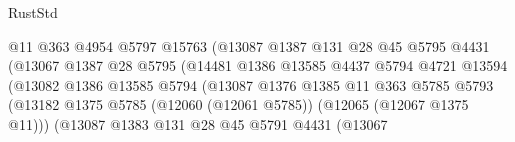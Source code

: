 \begin{lexlean}{RustStd}
\begin{coremodule}
                                          @11
                                          @363
                                          @4954
                                          @5797
                                          @15763
                                          (@13087
                                            @1387
                                            @131
                                            @28
                                            @45
                                            @5795
                                            @4431
                                            (@13067
                                              @1387
                                              @28
                                              @5795
                                              (@14481
                                                @1386
                                                @13585
                                                @4437
                                                @5794
                                                @4721
                                                @13594
                                                (@13082
                                                  @1386
                                                  @13585
                                                  @5794
                                                  (@13087
                                                    @1376
                                                    @1385
                                                    @11
                                                    @363
                                                    @5785
                                                    @5793
                                                    (@13182
                                                      @1375
                                                      @5785
                                                      (@12060 (@12061 @5785))
                                                      (@12065 (@12067 @1375 @11)))
                                                    (@13087
                                                      @1383
                                                      @131
                                                      @28
                                                      @45
                                                      @5791
                                                      @4431
                                                      (@13067

\end{coremodule}
\end{lexlean}
